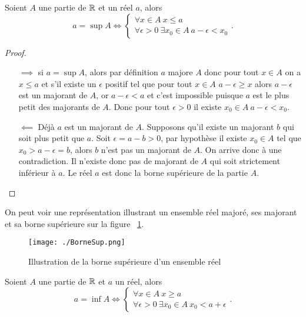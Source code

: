 \begin{theo}
  Soient \(A\) une partie de \(\mathbb{R}\) et un réel \(a\), alors
  \begin{equation}
    a = \sup A \iff \begin{cases} \forall x \in A \ x\leqslant a \\  \forall 
      \epsilon >0 \ \exists x_0 \in A \ a - \epsilon < x_0
    \end{cases}.
  \end{equation}
\end{theo}

\begin{proof}
  \begin{itemize}
    \item[\(\implies\)] si \(a = \sup A\), alors par définition \(a\) majore 
      \(A\) donc pour tout \(x \in A\) on a \(x\leqslant a\) et s'il existe un 
      \(\epsilon\) positif tel que pour tout \(x\in A\) \(a - \epsilon\geqslant 
      x\) alors \(a - \epsilon\) est un majorant de \(A\), or \(a - \epsilon < 
      a\) et c'est impossible puisque \(a\) est le plus petit des majorants de 
      \(A\).  Donc pour tout \(\epsilon >0\) il existe \(x_0\in A \ a - \epsilon 
      < x_0\).
    \item [\(\impliedby\)] Déjà \(a\) est un majorant de \(A\). Supposons qu'il 
      existe un majorant \(b\) qui soit plus petit que \(a\). Soit \(\epsilon = 
      a - b>0\), par hypothèse il existe \(x_0\in A\) tel que \(x_0>a - \epsilon 
      = b\), alors \(b\) n'est pas un majorant de \(A\). On arrive donc à une 
      contradiction. Il n'existe donc pas de majorant de \(A\) qui soit 
      strictement inférieur à \(a\). Le réel \(a\) est donc la borne supérieure 
      de la partie \(A\).
  \end{itemize}
\end{proof}
On peut voir une représentation illustrant un ensemble réel majoré, ses majorant 
et sa borne supérieure sur la figure~
\ref{fig:BorneSup}.
\begin{figure}[h]
  \centering
  \texttt{[image: ./BorneSup.png]}
  \caption{Illustration de la borne supérieure d'un ensemble réel}
  \label{fig:BorneSup}
\end{figure}
\begin{theo}
  Soient \(A\) une partie de \(\mathbb{R}\) et \(a\) un réel, alors
  \begin{equation}
    a = \inf A \iff \begin{cases} \forall x \in A \ x\geqslant a \\  \forall 
    \epsilon >0 \ \exists x_0\in A \ x_0<a + \epsilon\end{cases}.
  \end{equation}
\end{theo}
